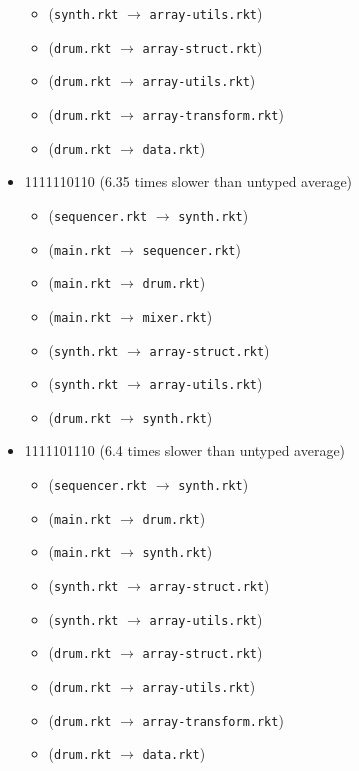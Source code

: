 \documentclass{article}
\newcommand{\mono}[1]{\texttt{#1}}
\begin{document}
\begin{itemize}
\begin{itemize}
  \item (\mono{synth.rkt} $\rightarrow$ \mono{array-utils.rkt})
  \item (\mono{drum.rkt} $\rightarrow$ \mono{array-struct.rkt})
  \item (\mono{drum.rkt} $\rightarrow$ \mono{array-utils.rkt})
  \item (\mono{drum.rkt} $\rightarrow$ \mono{array-transform.rkt})
  \item (\mono{drum.rkt} $\rightarrow$ \mono{data.rkt})
  \end{itemize}
\item 1111110110 (6.35 times slower than untyped average)
  \begin{itemize}
  \item (\mono{sequencer.rkt} $\rightarrow$ \mono{synth.rkt})
  \item (\mono{main.rkt} $\rightarrow$ \mono{sequencer.rkt})
  \item (\mono{main.rkt} $\rightarrow$ \mono{drum.rkt})
  \item (\mono{main.rkt} $\rightarrow$ \mono{mixer.rkt})
  \item (\mono{synth.rkt} $\rightarrow$ \mono{array-struct.rkt})
  \item (\mono{synth.rkt} $\rightarrow$ \mono{array-utils.rkt})
  \item (\mono{drum.rkt} $\rightarrow$ \mono{synth.rkt})
  \end{itemize}
\item 1111101110 (6.4 times slower than untyped average)
  \begin{itemize}
  \item (\mono{sequencer.rkt} $\rightarrow$ \mono{synth.rkt})
  \item (\mono{main.rkt} $\rightarrow$ \mono{drum.rkt})
  \item (\mono{main.rkt} $\rightarrow$ \mono{synth.rkt})
  \item (\mono{synth.rkt} $\rightarrow$ \mono{array-struct.rkt})
  \item (\mono{synth.rkt} $\rightarrow$ \mono{array-utils.rkt})
  \item (\mono{drum.rkt} $\rightarrow$ \mono{array-struct.rkt})
  \item (\mono{drum.rkt} $\rightarrow$ \mono{array-utils.rkt})
  \item (\mono{drum.rkt} $\rightarrow$ \mono{array-transform.rkt})
  \item (\mono{drum.rkt} $\rightarrow$ \mono{data.rkt})
  \end{itemize}

\end{itemize}
\end{document}
